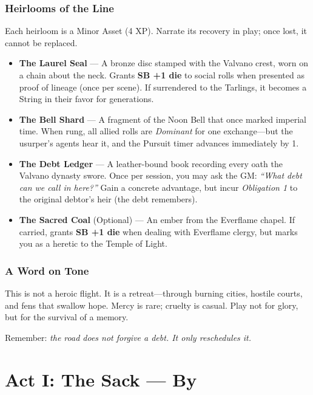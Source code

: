 \documentclass[11pt,a5paper]{book}
\newcommand{\sb}[1]{\textbf{SB #1}}
\newcommand{\condition}[1]{\textit{#1}}
\begin{document}
\subsection*{Heirlooms of the Line}

Each heirloom is a Minor Asset (4 XP). Narrate its recovery in play; once lost, it cannot be replaced.

\begin{itemize}[leftmargin=*]
\item \textbf{The Laurel Seal} --- A bronze disc stamped with the Valvano crest, worn on a chain about the neck. Grants \sb{+1 die} to social rolls when presented as proof of lineage (once per scene). If surrendered to the Tarlings, it becomes a String in their favor for generations.
\item \textbf{The Bell Shard} --- A fragment of the Noon Bell that once marked imperial time. When rung, all allied rolls are \condition{Dominant} for one exchange---but the usurper's agents hear it, and the Pursuit timer advances immediately by 1.
\item \textbf{The Debt Ledger} --- A leather-bound book recording every oath the Valvano dynasty swore. Once per session, you may ask the GM: \textit{``What debt can we call in here?''} Gain a concrete advantage, but incur \condition{Obligation 1} to the original debtor's heir (the debt remembers).
\item \textbf{The Sacred Coal} (Optional) --- An ember from the Everflame chapel. If carried, grants \sb{+1 die} when dealing with Everflame clergy, but marks you as a heretic to the Temple of Light.
\end{itemize}

\subsection*{A Word on Tone}

This is not a heroic flight. It is a retreat---through burning cities, hostile courts, and fens that swallow hope. Mercy is rare; cruelty is casual. Play not for glory, but for the survival of a memory. 

Remember: \textit{the road does not forgive a debt. It only reschedules it.}

\clearpage

\chapter{Act I: The Sack --- By \valerius}
\end{document}
